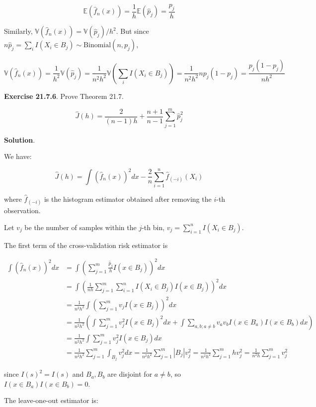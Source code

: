 \[\mathbb{E}(\hat{f}_n(x)) = \frac{1}{h} \mathbb{E}(\hat{p}_j) = \frac{p_j}{h}\]

Similarly, \(\mathbb{V}(\hat{f}_n(x)) = \mathbb{V}(\hat{p}_j) / h^2\).
But since
\(n \hat{p}_j = \sum_i I(X_i \in B_j) \sim \text{Binomial}(n, p_j)\),

\[\mathbb{V}(\hat{f}_n(x)) = \frac{1}{h^2} \mathbb{V}(\hat{p}_j) = \frac{1}{n^2h^2} \mathbb{V}\left( \sum_i I(X_i \in B_j) \right) = \frac{1}{n^2h^2} n p_j (1 - p_j) = \frac{p_j (1 - p_j)}{nh^2} \]

\textbf{Exercise 21.7.6}. Prove Theorem 21.7.

\[ \hat{J}(h) = \frac{2}{(n - 1)h} + \frac{n+1}{n-1} \sum_{j=1}^m \hat{p}_j^2 \]

\textbf{Solution}.

We have:

\[ \hat{J}(h) = \int \left( \hat{f}_n(x) \right)^2 dx - \frac{2}{n} \sum_{i=1}^n \hat{f}_{(-i)}(X_i)\]

where \(\hat{f}_{(-i)}\) is the histogram estimator obtained after
removing the \(i\)-th observation.

Let \(v_j\) be the number of samples within the \(j\)-th bin,
\(v_j = \sum_{i=1}^n I(X_i \in B_j)\).

The first term of the cross-validation risk estimator is

\[
\begin{align}
\int \left( \hat{f}_n(x) \right)^2 dx &= \int \left( \sum_{j=1}^m \frac{\hat{p}_j}{h} I(x \in B_j) \right)^2 dx\\
&= \int \left( \frac{1}{nh}  \sum_{j=1}^m \sum_{i=1}^n I(X_i \in B_j) I(x \in B_j) \right)^2 dx \\
&= \frac{1}{n^2h^2} \int \left( \sum_{j=1}^m v_j I(x \in B_j) \right)^2 dx \\
&= \frac{1}{n^2h^2} \left( \int \sum_{j=1}^m v_j^2 I(x \in B_j)^2 dx  + \int \sum_{a, b; a \neq b}  v_a v_b I(x \in B_a) I(x \in B_b) dx\right) \\
&= \frac{1}{n^2h^2} \int \sum_{j=1}^m v_j^2 I(x \in B_j) dx \\
&= \frac{1}{n^2h^2} \sum_{j=1}^m \int_{B_j} v_j^2 dx = \frac{1}{n^2h^2} \sum_{j=1}^m \left| B_j \right| v_j^2 = \frac{1}{n^2h^2} \sum_{j=1}^m h v_j^2 = \frac{1}{n^2h} \sum_{j=1}^m v_j^2
\end{align}
\]

since \(I(s)^2 = I(s)\) and \(B_a, B_b\) are disjoint for \(a \neq b\),
so \(I(x \in B_a) I(x \in B_b) = 0\).

The leave-one-out estimator is:

